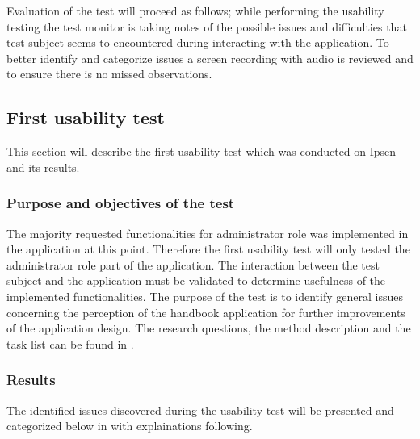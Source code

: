 Evaluation of the test will proceed as follows; while performing the usability testing the test monitor is taking notes of the possible issues and difficulties that test subject seems to encountered during interacting with the application. 
To better identify and categorize issues a screen recording with audio is reviewed and to ensure there is no missed observations.

\subsection{First usability test}
This section will describe the first usability test which was conducted on Ipsen and its results.

\subsubsection{Purpose and objectives of the test}
The majority requested functionalities for administrator role was implemented in the application at this point. 
Therefore the first usability test will only tested the administrator role part of the application.
The interaction between the test subject and the application must be validated to determine usefulness of the implemented functionalities. 
The purpose of the test is to identify general issues concerning the perception of the handbook application for further improvements of the application design.
The research questions, the method description and the task list can be found in .

\subsubsection{Results}
The identified issues discovered during the usability test will be presented and categorized below in  with explainations following. 

